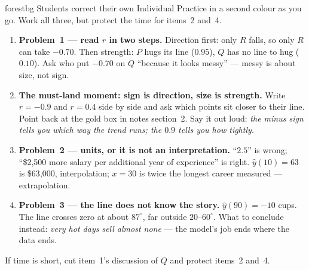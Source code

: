 \documentclass[10pt]{article}
\begin{document}
\boxguard
\begin{skillbox}{forestbg}
Students correct their own Individual Practice in a second colour as you go. Work all three, but
protect the time for items~2 and~4.
\begin{enumerate}[leftmargin=1.3em, nosep, itemsep=2pt]
  \item \textbf{Problem~1 --- read $r$ in two steps.} Direction first: only $R$ falls, so only
        $R$ can take $-0.70$. Then strength: $P$ hugs its line ($0.95$), $Q$ has no line to hug
        ($0.10$). Ask who put $-0.70$ on $Q$ ``because it looks messy'' --- messy is about size,
        not sign.
  \item \textbf{The must-land moment: sign is direction, size is strength.} Write $r=-0.9$ and
        $r=0.4$ side by side and ask which points sit closer to their line. Point back at the gold
        box in notes section~2. Say it out loud: \emph{the minus sign tells you which way the
        trend runs; the $0.9$ tells you how tightly.}
  \item \textbf{Problem~2 --- units, or it is not an interpretation.} ``$2.5$'' is wrong;
        ``\$2{,}500 more salary per additional year of experience'' is right. $\hat y(10)=63$ is
        \$63{,}000, interpolation; $x=30$ is twice the longest career measured --- extrapolation.
  \item \textbf{Problem~3 --- the line does not know the story.} $\hat y(90)=-10$ cups. The line
        crosses zero at about $87^\circ$, far outside $20$--$60^\circ$. What to conclude instead:
        \emph{very hot days sell almost none} --- the model's job ends where the data ends.
\end{enumerate}
If time is short, cut item~1's discussion of $Q$ and protect items~2 and~4.
\end{skillbox}
\end{document}
